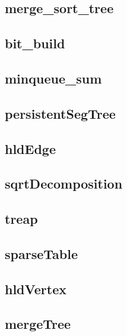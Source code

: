 \subsection{merge_sort_tree}
\raggedbottom
\hrulefill
\subsection{bit_build}
\raggedbottom
\hrulefill
\subsection{minqueue_sum}
\raggedbottom
\hrulefill
\subsection{persistentSegTree}
\raggedbottom
\hrulefill
\subsection{hldEdge}
\raggedbottom
\hrulefill
\subsection{sqrtDecomposition}
\raggedbottom
\hrulefill
\subsection{treap}
\raggedbottom
\hrulefill
\subsection{sparseTable}
\raggedbottom
\hrulefill
\subsection{hldVertex}
\raggedbottom
\hrulefill
\subsection{mergeTree}
\raggedbottom
\hrulefill
